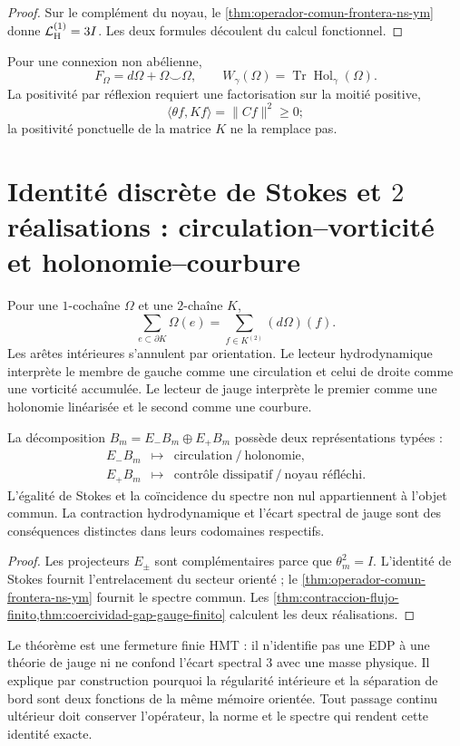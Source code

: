 \begin{proof}
Sur le complément du noyau, le
\cref{thm:operador-comun-frontera-ns-ym} donne
\(\mathcal L_{\rm H}^{(1)}=3I\). Les deux formules
découlent du calcul fonctionnel.
\end{proof}

Pour une connexion non abélienne,
\[
 F_\Omega=d\Omega+\Omega\smile\Omega,
\qquad
 W_\gamma(\Omega)=\operatorname{Tr}\operatorname{Hol}_\gamma(\Omega).
\]
La positivité par réflexion requiert une factorisation sur la moitié
positive,
\[
 \langle\theta f,Kf\rangle=\|Cf\|^2\geq0;
\]
la positivité ponctuelle de la matrice \(K\) ne la remplace pas.

\section[Identité de Stokes : circulation--vorticité et holonomie--courbure]{Identité discrète de Stokes et \(2\) réalisations : circulation--vorticité et holonomie--courbure}

Pour une \(1\)-cochaîne \(\Omega\) et une \(2\)-chaîne \(K\),
\[
 \sum_{e\subset\partial K}\Omega(e)
 =
 \sum_{f\in K^{(2)}}(d\Omega)(f).
\]
Les arêtes intérieures s'annulent par orientation. Le lecteur
hydrodynamique interprète le membre de gauche comme une circulation et celui de droite
comme une vorticité accumulée. Le lecteur de jauge interprète le premier comme une
holonomie linéarisée et le second comme une courbure.

\begin{theorem}
\label{thm:hoja-comun-frontera}
La décomposition \(B_m=E_-B_m\oplus E_+B_m\) possède deux représentations
typées :
\[
\boxed{
\begin{array}{ccl}
E_-B_m&\longmapsto&
\text{circulation}\ /\ \text{holonomie},\\[2mm]
E_+B_m&\longmapsto&
\text{contrôle dissipatif}\ /\ \text{noyau réfléchi}.
\end{array}}
\]
L'égalité de Stokes et la coïncidence du spectre non nul appartiennent à
l'objet commun. La contraction hydrodynamique et l'écart spectral de jauge sont des conséquences
distinctes dans leurs codomaines respectifs.
\end{theorem}

\begin{proof}
Les projecteurs \(E_\pm\) sont complémentaires parce que
\(\theta_m^2=I\). L'identité de Stokes fournit l'entrelacement du
secteur orienté ; le \cref{thm:operador-comun-frontera-ns-ym} fournit le
spectre commun. Les
\cref{thm:contraccion-flujo-finito,thm:coercividad-gap-gauge-finito}
calculent les deux réalisations.
\end{proof}

Le théorème est une fermeture finie HMT : il n'identifie pas une EDP à une théorie
de jauge ni ne confond l'écart spectral \(3\) avec une masse physique. Il explique par construction
pourquoi la régularité intérieure et la séparation de bord sont deux fonctions de
la même mémoire orientée. Tout passage continu ultérieur doit conserver
l'opérateur, la norme et le spectre qui rendent cette identité exacte.
\endgroup
